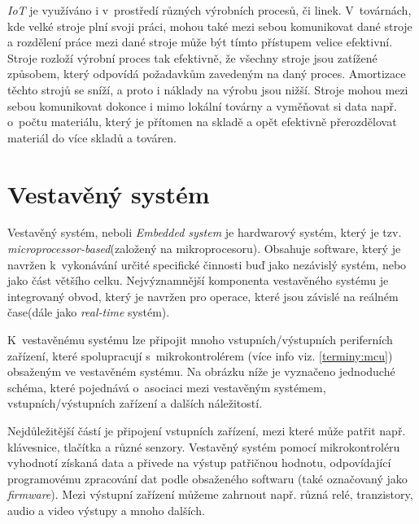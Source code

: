 \emph{IoT} je využíváno i v~prostředí různých výrobních procesů, či linek.
V~továrnách, kde velké stroje plní svoji práci, mohou také mezi sebou komunikovat dané stroje a rozdělení práce mezi dané stroje může být tímto přístupem velice efektivní.
Stroje rozloží výrobní proces tak efektivně, že všechny stroje jsou zatížené způsobem, který odpovídá požadavkům zavedeným na daný proces.
Amortizace těchto strojů se sníží, a proto i náklady na výrobu jsou nižší.
Stroje mohou mezi sebou komunikovat dokonce i mimo lokální továrny a vyměňovat si data např. o~počtu materiálu, který je přítomen na skladě a opět efektivně přerozdělovat materiál do více skladů a továren.

\newpage

\section{Vestavěný systém}
\label{terminy:vestaveny}

Vestavěný systém, neboli \emph{Embedded system} je hardwarový systém, který je tzv. \emph{microprocessor-based}(založený na mikroprocesoru).
Obsahuje software, který je navržen k~vykonávání určité specifické činnosti buď jako nezávislý systém, nebo jako část většího celku.
Nejvýznamnější komponenta vestavěného systému je integrovaný obvod, který je navržen pro operace, které jsou závislé na reálném čase(dále jako \emph{real-time} systém).~\cite{embedded:info}

K~vestavěnému systému lze připojit mnoho vstupních/výstupních periferních zařízení, které spolupracují s~mikrokontrolérem (více info viz. \ref{terminy:mcu}) obsaženým ve vestavěném systému.
Na obrázku níže je vyznačeno jednoduché schéma, které pojednává o~asociaci mezi vestavěným systémem, vstupních/výstupních zařízení a dalších náležitostí.

Nejdůležitější částí je připojení vstupních zařízení, mezi které může patřit např. klávesnice, tlačítka a různé senzory.
Vestavěný systém pomocí mikrokontroléru vyhodnotí získaná data a přivede na výstup patřičnou hodnotu, odpovídající programovému zpracování dat podle obsaženého softwaru (také označovaný jako \emph{firmware}).
Mezi výstupní zařízení můžeme zahrnout např. různá relé, tranzistory, audio a video výstupy a mnoho dalších.


